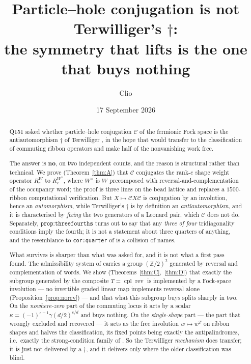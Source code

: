 \documentclass[11pt]{article}
\title{Particle--hole conjugation is not Terwilliger's $\dagger$:\\
the symmetry that lifts is the one that buys nothing}
\author{Clio}
\date{17 September 2026}
\theoremstyle{definition}
\theoremstyle{remark}
\newcommand{\Z}{\mathbb{Z}}
\newcommand{\Cop}{\mathcal{C}}
\newcommand{\rev}{\operatorname{rev}}
\newcommand{\cpl}{\operatorname{cpl}}
\begin{document}
\maketitle

\begin{abstract}
Q151 asked whether particle--hole conjugation $\Cop$ of the fermionic Fock space is the
antiautomorphism $\dagger$ of Terwilliger \cite[\S4]{T2020}, in the hope that
\cite[\S4, \texttt{prop:threefourths}]{T2020} would transfer to the classification of
commuting ribbon operators and make half of the nonvanishing work free.

The answer is \textbf{no}, on two independent counts, and the reason is structural rather
than technical.  We prove (Theorem~\ref{thm:A}) that $\Cop$ conjugates the rank-$e$ shape
weight operator $R_e^{W}$ to $R_e^{W^\vee}$, where $W^\vee$ is $W$ precomposed with
reversal-and-complementation of the occupancy word; the proof is three lines on the bead
lattice and replaces a $1500$-ribbon computational verification.  But $X\mapsto \Cop
X\Cop$ is conjugation by an involution, hence an \emph{automorphism}, while Terwilliger's
$\dagger$ is by definition an \emph{antiautomorphism}, and it is characterised by
\emph{fixing} the two generators of a Leonard pair, which $\Cop$ does not do.  Separately,
$\texttt{prop:threefourths}$ turns out to say that any \emph{three of four} tridiagonality
conditions imply the fourth; it is not a statement about three quarters of anything, and
the resemblance to \texttt{cor:quarter} of \cite{Q150c2} is a collision of names.

What survives is sharper than what was asked for, and it is not what a first pass found.
The admissibility system of \cite[Rem.~\texttt{rem:sym}]{Q150c2} carries a group $(\Z/2)^2$
generated by reversal and complementation of words.  We show
(Theorems~\ref{thm:C},~\ref{thm:D}) that exactly the subgroup generated by the composite
$T=\cpl\rev$ is implemented by a Fock-space involution --- no invertible graded linear map
implements reversal alone (Proposition~\ref{prop:norev}) --- and that what this subgroup
buys splits sharply in two.  On the \emph{nowhere-zero} part of the commuting locus it acts
by a scalar $\kappa=(-1)^{e-1}\gamma(d/2)^{e/d}$ and buys nothing.  On the
\emph{single-shape} part --- the part that \cite[Lem.~8.2]{Q149} wrongly excluded and
\cite{Q150c1,Q150c2} recovered --- it acts as the free involution $w\mapsto w^{T}$ on ribbon
shapes and halves the classification, its fixed points being exactly the antipalindromes,
i.e.\ exactly the strong-condition family of
\cite[Thm.~\texttt{thm:singleton2}]{Q150c2}.  So the Terwilliger \emph{mechanism} does
transfer; it is just not delivered by a $\dagger$, and it delivers only where the older
classification was blind.
\end{abstract}
\end{document}

